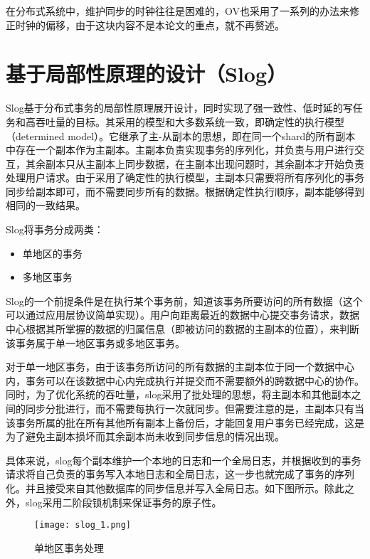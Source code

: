在分布式系统中，维护同步的时钟往往是困难的，OV也采用了一系列的办法来修正时钟的偏移，由于这块内容不是本论文的重点，就不再赘述。


\section{基于局部性原理的设计（Slog）}

Slog基于分布式事务的局部性原理展开设计\cite{MasterPartition1}，同时实现了强一致性、低时延的写任务和高吞吐量的目标。其采用的模型和大多数系统一致，即确定性的执行模型（determined model）。它继承了主-从副本的思想，即在同一个shard的所有副本中存在一个副本作为主副本。\cite{MasterPartition2}主副本负责实现事务的序列化，并负责与用户进行交互，其余副本只从主副本上同步数据，在主副本出现问题时，其余副本才开始负责处理用户请求。\cite{MasterPartition3}由于采用了确定性的执行模型，主副本只需要将所有序列化的事务同步给副本即可，而不需要同步所有的数据。根据确定性执行顺序，副本能够得到相同的一致结果。

Slog将事务分成两类：

\begin{itemize}
\item 单地区的事务
\item 多地区事务
\end{itemize}

Slog的一个前提条件是在执行某个事务前，知道该事务所要访问的所有数据（这个可以通过应用层协议简单实现）。用户向距离最近的数据中心提交事务请求，数据中心根据其所掌握的数据的归属信息（即被访问的数据的主副本的位置），来判断该事务属于单一地区事务或多地区事务。

对于单一地区事务，由于该事务所访问的所有数据的主副本位于同一个数据中心内，事务可以在该数据中心内完成执行并提交而不需要额外的跨数据中心的协作。同时，为了优化系统的吞吐量，slog采用了批处理的思想，将主副本和其他副本之间的同步分批进行，而不需要每执行一次就同步。但需要注意的是，主副本只有当该事务所属的批在所有其他所有副本上备份后，才能回复用户事务已经完成，这是为了避免主副本损坏而其余副本尚未收到同步信息的情况出现。

具体来说，slog每个副本维护一个本地的日志和一个全局日志\cite{Log}，并根据收到的事务请求将自己负责的事务写入本地日志和全局日志，这一步也就完成了事务的序列化。并且接受来自其他数据库的同步信息并写入全局日志。如下图所示。除此之外，slog采用二阶段锁机制来保证事务的原子性。

\begin{figure}[htb]
  \centering
  \texttt{[image: slog\_1.png]}
  \caption{单地区事务处理}
  \label{fig:badge}
\end{figure}


